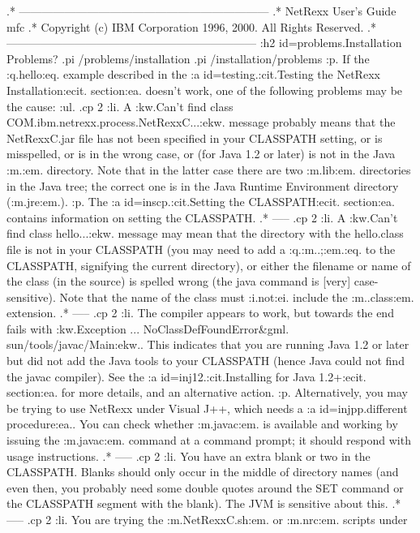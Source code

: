.* ------------------------------------------------------------------
.* NetRexx User's Guide                                              mfc
.* Copyright (c) IBM Corporation 1996, 2000.  All Rights Reserved.
.* ------------------------------------------------------------------
:h2 id=problems.Installation Problems?
.pi /problems/installation
.pi /installation/problems
:p.
If the :q.hello:eq. example described in the :a id=testing.:cit.Testing
the NetRexx Installation:ecit. section:ea. doesn't work, one of the
following problems may be the cause:
:ul.
.cp 2
:li.
A :kw.Can't find class COM.ibm.netrexx.process.NetRexxC...:ekw. message
probably means that the NetRexxC.jar file has not been specified in your
CLASSPATH setting, or is misspelled, or is in the wrong case, or (for
Java 1.2 or later) is not in the Java :m.\lib\ext:em. directory.  Note
that in the latter case there are two :m.lib:em. directories in the Java
tree; the correct one is in the Java Runtime Environment directory
(:m.jre:em.).
:p.
The :a id=inscp.:cit.Setting the CLASSPATH:ecit. section:ea. contains
information on setting the CLASSPATH.
.* -----
.cp 2
:li.
A :kw.Can't find class hello...:ekw. message may mean that the directory
with the hello.class file is not in your CLASSPATH (you may need to
add a :q.:m..;:em.:eq. to the CLASSPATH, signifying the current
directory), or either the filename or name of the class (in the source)
is spelled wrong (the java command is [very] case-sensitive).  Note that
the name of the class must :i.not:ei. include the :m..class:em.
extension.
.* -----
.cp 2
:li.
The compiler appears to work, but towards the end fails with
:kw.Exception ... NoClassDefFoundError&gml. sun/tools/javac/Main:ekw..
This indicates that you are running Java 1.2 or later but did not add
the Java tools to your CLASSPATH (hence Java could not find the javac
compiler).  See the :a id=inj12.:cit.Installing for Java 1.2+:ecit.
section:ea. for more details, and an alternative action.
:p.
Alternatively, you may be trying to use NetRexx under Visual J++, which
needs a :a id=injpp.different procedure:ea..
You can check whether :m.javac:em. is available and working by issuing
the :m.javac:em. command at a command prompt; it should respond with
usage instructions.
.* -----
.cp 2
:li.
You have an extra blank or two in the CLASSPATH.  Blanks should only
occur in the middle of directory names (and even then, you probably need
some double quotes around the SET command or the CLASSPATH segment with
the blank).  The JVM is sensitive about this.
.* -----
.cp 2
:li.
You are trying the :m.NetRexxC.sh:em. or :m.nrc:em. scripts under

